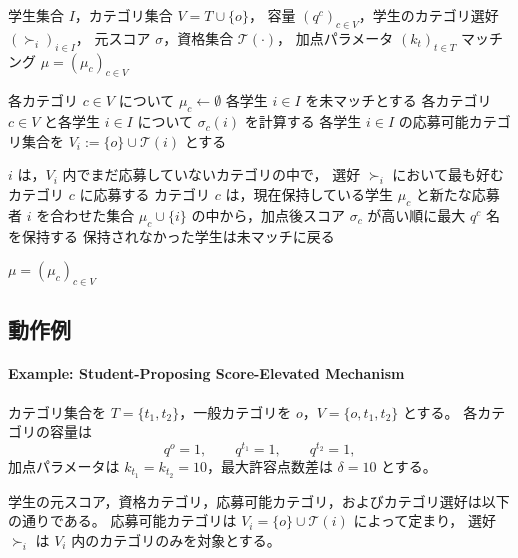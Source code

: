 \documentclass[
  12pt,
  a4paper,
  oneside,
  onecolumn,
  titlepage,
  final
]{jsarticle}
\newcommand{\1}{\mathbf{1}}
\begin{document}
\begin{algorithm}[H]
\caption{\textsc{Student-Proposing Score-Elevated Mechanism}}
\label{alg:student-proposing-score-elevated}
\begin{algorithmic}[1]
\Require 学生集合 $I$，カテゴリ集合 $V=T\cup\{o\}$，
         容量 $(q^c)_{c\in V}$，学生のカテゴリ選好 $(\succ_i)_{i\in I}$，
         元スコア $\sigma$，資格集合 $\mathcal{T}(\cdot)$，
         加点パラメータ $(k_t)_{t\in T}$
\Ensure マッチング $\mu=(\mu_c)_{c\in V}$
 
\State 各カテゴリ $c\in V$ について $\mu_c\gets\emptyset$
\State 各学生 $i\in I$ を未マッチとする
\State 各カテゴリ $c\in V$ と各学生 $i\in I$ について $\sigma_c(i)$ を計算する
\State 各学生 $i\in I$ の応募可能カテゴリ集合を
       $V_i := \{o\} \cup \mathcal{T}(i)$ とする
 
    \State $i$ は，$V_i$ 内でまだ応募していないカテゴリの中で，
           選好 $\succ_i$ において最も好むカテゴリ $c$ に応募する
    \State カテゴリ $c$ は，現在保持している学生 $\mu_c$ と新たな応募者 $i$ を合わせた集合
           $\mu_c\cup\{i\}$ の中から，加点後スコア $\sigma_c$ が高い順に最大 $q^c$ 名を保持する
    \State 保持されなかった学生は未マッチに戻る
\EndWhile
 
\State \Return $\mu=(\mu_c)_{c\in V}$
\end{algorithmic}
\end{algorithm}



\subsection{動作例}
 
\paragraph{Example: Student-Proposing Score-Elevated Mechanism}
\label{ex:student-proposing-score-elevated}
カテゴリ集合を $T=\{t_1,t_2\}$，一般カテゴリを $o$，$V=\{o,t_1,t_2\}$ とする。
各カテゴリの容量は
\[
    q^o=1,\qquad q^{t_1}=1,\qquad q^{t_2}=1,
\]
加点パラメータは $k_{t_1}=k_{t_2}=10$，最大許容点数差は $\delta=10$ とする。
 
学生の元スコア，資格カテゴリ，応募可能カテゴリ，およびカテゴリ選好は以下の通りである。
応募可能カテゴリは $V_i=\{o\}\cup\mathcal{T}(i)$ によって定まり，
選好 $\succ_i$ は $V_i$ 内のカテゴリのみを対象とする。
 
\end{document}
